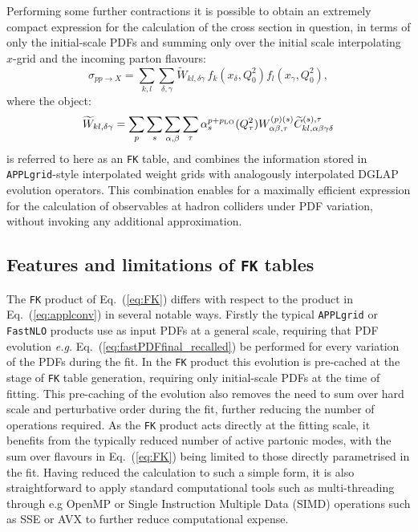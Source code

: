 \documentclass[preprint,12pt]{elsarticle}
\begin{document}
Performing some further contractions it is possible to obtain an
extremely compact expression for the calculation of the cross section
in question, in terms of only the initial-scale PDFs and summing only
over the initial scale interpolating $x$-grid and the incoming parton
flavours:
\begin{equation}\label{eq:FK}
  \sigma _{pp\to X} = \sum_{k,l}\sum_{\delta,\gamma} 
  \widetilde{W}_{kl,\delta\gamma} \,f_k(x_\delta,Q^2_0) f_l(x_\gamma,Q^2_0),
\end{equation}
where the object:
\begin{equation}\label{eq:FKTable}
  \widetilde{W}_{kl,\delta\gamma} = \sum_p\sum_{s}\sum_{\alpha,\beta} \sum_{\tau}
\alpha_s^{p+p_{\rm LO}}(Q^2_\tau)  W_{\alpha\beta,\tau}^{(p)(s)} \widetilde{C}^{(s),\tau}_{kl,\alpha\beta\gamma\delta}
\end{equation}
is referred to here as an {\tt FK} table, and combines the information
stored in {\tt APPLgrid}-style interpolated weight grids with
analogously interpolated DGLAP evolution operators. This combination
enables for a maximally efficient expression for the
calculation of observables at hadron colliders under PDF variation, without invoking
any additional approximation. 

\subsection{Features and limitations of {\tt FK} tables}

The {\tt FK} product of Eq.~(\ref{eq:FK}) differs with respect to the
product in Eq.~(\ref{eq:applconv}) in several notable ways. Firstly
the typical {\tt APPLgrid} or {\tt FastNLO} products use as input PDFs at a
general scale, requiring that PDF evolution {\it e.g.}
Eq.~(\ref{eq:fastPDFfinal_recalled}) be performed for every variation of the PDFs
during the fit. In the {\tt FK} product
this evolution is pre-cached at the stage of {\tt FK} table
generation, requiring only initial-scale PDFs at the time of fitting. 
This pre-caching of the evolution also removes the need to
 sum over hard scale and perturbative order during the
fit, further reducing the number of operations required. As the {\tt FK}
product acts directly at the fitting scale, it benefits from the typically reduced number of active
partonic modes, with the sum over flavours in
Eq.~(\ref{eq:FK}) being limited to those directly parametrised in the
fit. Having reduced the calculation to such a simple form, it is also
straightforward to apply standard 
computational tools such as multi-threading through e.g OpenMP or
Single Instruction Multiple Data (SIMD) operations such as SSE or AVX to
further reduce computational expense. 
\end{document}
